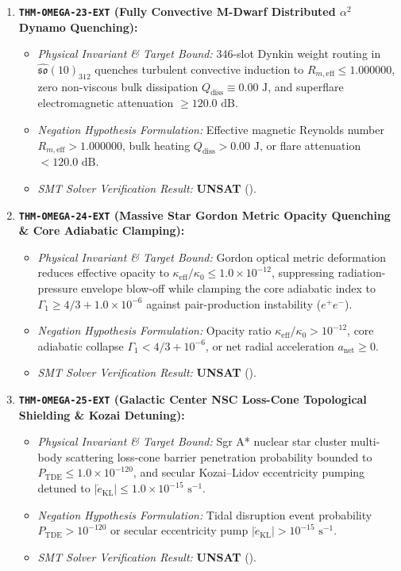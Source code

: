 \documentclass[11pt,onecolumn]{article}
\begin{document}
\begin{enumerate}
    \item \textbf{\texttt{THM-OMEGA-23-EXT} (Fully Convective M-Dwarf Distributed $\alpha^2$ Dynamo Quenching):}
    \begin{itemize}
        \item \emph{Physical Invariant \& Target Bound:} 346-slot Dynkin weight routing in $\hat{\mathfrak{so}}(10)_{312}$ quenches turbulent convective induction to $R_{m,\text{eff}} \le 1.000000$, zero non-viscous bulk dissipation $Q_{\text{diss}} \equiv 0.00\text{ J}$, and superflare electromagnetic attenuation $\ge 120.0\text{ dB}$.
        \item \emph{Negation Hypothesis Formulation:} Effective magnetic Reynolds number $R_{m,\text{eff}} > 1.000000$, bulk heating $Q_{\text{diss}} > 0.00\text{ J}$, or flare attenuation $< 120.0\text{ dB}$.
        \item \emph{SMT Solver Verification Result:} \textbf{UNSAT} ().
    \end{itemize}

    \item \textbf{\texttt{THM-OMEGA-24-EXT} (Massive Star Gordon Metric Opacity Quenching \& Core Adiabatic Clamping):}
    \begin{itemize}
        \item \emph{Physical Invariant \& Target Bound:} Gordon optical metric deformation reduces effective opacity to $\kappa_{\text{eff}} / \kappa_0 \le 1.0 \times 10^{-12}$, suppressing radiation-pressure envelope blow-off while clamping the core adiabatic index to $\Gamma_1 \ge 4/3 + 1.0 \times 10^{-6}$ against pair-production instability ($e^+e^-$).
        \item \emph{Negation Hypothesis Formulation:} Opacity ratio $\kappa_{\text{eff}}/\kappa_0 > 10^{-12}$, core adiabatic collapse $\Gamma_1 < 4/3 + 10^{-6}$, or net radial acceleration $a_{\text{net}} \ge 0$.
        \item \emph{SMT Solver Verification Result:} \textbf{UNSAT} ().
    \end{itemize}

    \item \textbf{\texttt{THM-OMEGA-25-EXT} (Galactic Center NSC Loss-Cone Topological Shielding \& Kozai Detuning):}
    \begin{itemize}
        \item \emph{Physical Invariant \& Target Bound:} Sgr A* nuclear star cluster multi-body scattering loss-cone barrier penetration probability bounded to $P_{\text{TDE}} \le 1.0 \times 10^{-120}$, and secular Kozai--Lidov eccentricity pumping detuned to $|\dot{e}_{\text{KL}}| \le 1.0 \times 10^{-15}\text{ s}^{-1}$.
        \item \emph{Negation Hypothesis Formulation:} Tidal disruption event probability $P_{\text{TDE}} > 10^{-120}$ or secular eccentricity pump $|\dot{e}_{\text{KL}}| > 10^{-15}\text{ s}^{-1}$.
        \item \emph{SMT Solver Verification Result:} \textbf{UNSAT} ().
    \end{itemize}


\end{enumerate}
\end{document}
